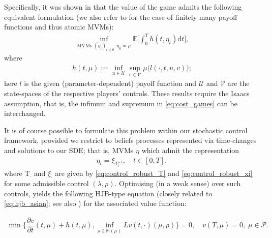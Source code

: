 \documentclass{article}
\theoremstyle{definition}
\numberwithin{equation}{section}
\numberwithin{theorem}{section}
\newcommand{\E}{\mathbb{E}}
\newcommand{\pian}[2]{\dfrac{\partial #1}{\partial #2}}
\newcommand{\dt}{\mathrm{d}t}
\newcommand{\Hb}{\mathbb{H}}
\newcommand{\T}{\mathrm{T}}
\newcommand{\Pc}{\mathcal{P}}
\begin{document}
	
	Specifically, it was shown in \cite[Theorem~3.2]{cardaliaguet2012} that the value of the game admits the following equivalent formulation (we also refer to \cite[Theorem~3.1]{cardaliaguet_rainer2009} for the case of finitely many payoff functions and thus atomic MVMs):
	\begin{align*}%
		\inf_{\textrm{MVMs $(\eta_t)_{t\ge 0}:\eta_0=\mu$}}
		\E\Big[\int_0^Th(t,\eta_t)\dt\Big],
	\end{align*}
	where
	\begin{align}\label{eq:cost_games}
		h(t,\mu):=\inf_{u\in\mathcal{U}}\sup_{v\in\mathcal{V}}
		\mu\big(l(\cdot,t,u,v)\big);
	\end{align}
	here $l$ is the given (parameter-dependent) payoff function and $\mathcal{U}$ and $\mathcal{V}$ are the state-spaces of the respective players' controls. These results require the Isaacs assumption, that is, the infimum and supremum in \eqref{eq:cost_games} can be interchanged.
	
	
	It is of course possible to formulate this problem within our stochastic control framework, provided we restrict to beliefs processes represented via time-changes and solutions to our SDE; that is, MVMs $\eta$ which admit the representation
	\begin{align*}
		\eta_t=\xi_{T^{-1}_t},\quad t\in[0,T],
	\end{align*}
	where $\T_\cdot$ and $\xi_\cdot$ are given by \eqref{eq:control_robust_T} and \eqref{eq:control_robust_xi} for some admissible control $(\lambda,\rho)$. Optimising (in a weak sense) over such controls, yields the following HJB-type equation (closely related to \eqref{eq:hjb_asian}; see also \cite[Section~4]{cardaliaguet2012}) for the associated value function:
	
        \begin{align*}%
          \min\bigg\{\pian{v}{t}(t,\mu)+h(t,\mu),
          \inf_{\rho\in\Hb(\mu)}Lv(t,\cdot)(\mu,\rho)
          \bigg\}=0,
          \quad v(T,\mu)=0,\;\mu\in\Pc.
        \end{align*}	 
        
\end{document}
